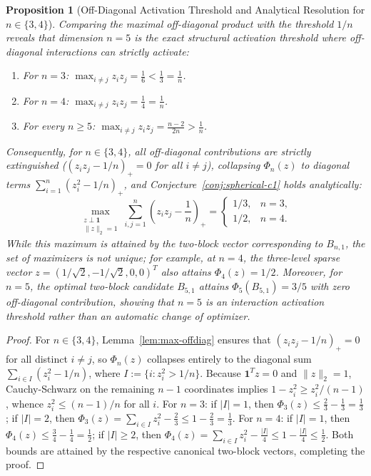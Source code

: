 \documentclass[11pt,reqno]{article}
\newtheorem{proposition}[theorem]{Proposition}
\theoremstyle{definition}
\newcommand{\one}{\mathbf{1}}
\begin{document}
\begin{itemize}
    \begin{proposition}[Off-Diagonal Activation Threshold and Analytical Resolution for $n \in \{3, 4\}$]\label{prop:spherical-small}
    Comparing the maximal off-diagonal product with the threshold $1/n$ reveals that dimension $n = 5$ is the exact structural activation threshold where off-diagonal interactions can strictly activate:
    \begin{enumerate}
        \item For $n = 3$: $\max_{i \ne j} z_i z_j = \frac{1}{6} < \frac{1}{3} = \frac{1}{n}$.
        \item For $n = 4$: $\max_{i \ne j} z_i z_j = \frac{1}{4} = \frac{1}{n}$.
        \item For every $n \ge 5$: $\max_{i \ne j} z_i z_j = \frac{n - 2}{2n} > \frac{1}{n}$.
    \end{enumerate}
    Consequently, for $n \in \{3, 4\}$, all off-diagonal contributions are strictly extinguished ($(z_i z_j - 1/n)_+ = 0$ for all $i \ne j$), collapsing $\Phi_n(z)$ to diagonal terms $\sum_{i=1}^n (z_i^2 - 1/n)_+$, and Conjecture~\ref{conj:spherical-c1} holds analytically:
    \begin{equation}
    \max_{\substack{z \perp \one \\ \|z\|_2 = 1}} \sum_{i,j=1}^n \left(z_i z_j - \frac{1}{n}\right)_+ = 
    \begin{cases}
    1/3, & n = 3, \\
    1/2, & n = 4.
    \end{cases}
    \end{equation}
    While this maximum is attained by the two-block vector corresponding to $B_{n, 1}$, the set of maximizers is not unique; for example, at $n=4$, the three-level sparse vector $z = (1/\sqrt{2}, -1/\sqrt{2}, 0, 0)^T$ also attains $\Phi_4(z) = 1/2$. Moreover, for $n = 5$, the optimal two-block candidate $B_{5, 1}$ attains $\Phi_5(B_{5, 1}) = 3/5$ with zero off-diagonal contribution, showing that $n=5$ is an interaction activation threshold rather than an automatic change of optimizer.
    \end{proposition}
    \begin{proof}
    For $n \in \{3, 4\}$, Lemma~\ref{lem:max-offdiag} ensures that $(z_i z_j - 1/n)_+ = 0$ for all distinct $i \ne j$, so $\Phi_n(z)$ collapses entirely to the diagonal sum $\sum_{i \in I} (z_i^2 - 1/n)$, where $I := \{i : z_i^2 > 1/n\}$. Because $\one^T z = 0$ and $\|z\|_2 = 1$, Cauchy-Schwarz on the remaining $n-1$ coordinates implies $1 - z_i^2 \ge z_i^2 / (n-1)$, whence $z_i^2 \le (n-1)/n$ for all $i$.
    For $n=3$: if $|I| = 1$, then $\Phi_3(z) \le \frac{2}{3} - \frac{1}{3} = \frac{1}{3}$; if $|I| = 2$, then $\Phi_3(z) = \sum_{i \in I} z_i^2 - \frac{2}{3} \le 1 - \frac{2}{3} = \frac{1}{3}$.
    For $n=4$: if $|I| = 1$, then $\Phi_4(z) \le \frac{3}{4} - \frac{1}{4} = \frac{1}{2}$; if $|I| \ge 2$, then $\Phi_4(z) = \sum_{i \in I} z_i^2 - \frac{|I|}{4} \le 1 - \frac{|I|}{4} \le \frac{1}{2}$.
    Both bounds are attained by the respective canonical two-block vectors, completing the proof.
    \end{proof}


\end{itemize}
\end{document}
